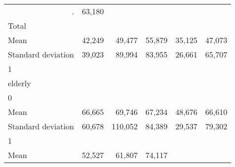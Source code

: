 \begin{tabular}{llllll}
  \multicolumn{1}{r}{.} &
  \multicolumn{1}{r}{63,180} \\
\multicolumn{1}{l}{\hspace{3em}Total} &
  \multicolumn{1}{|r}{} &
  \multicolumn{1}{r}{} &
  \multicolumn{1}{r}{} &
  \multicolumn{1}{r}{} &
  \multicolumn{1}{r}{} \\
\multicolumn{1}{l}{\hspace{4em}Mean} &
  \multicolumn{1}{|r}{42,249} &
  \multicolumn{1}{r}{49,477} &
  \multicolumn{1}{r}{55,879} &
  \multicolumn{1}{r}{35,125} &
  \multicolumn{1}{r}{47,073} \\
\multicolumn{1}{l}{\hspace{4em}Standard deviation} &
  \multicolumn{1}{|r}{39,023} &
  \multicolumn{1}{r}{89,994} &
  \multicolumn{1}{r}{83,955} &
  \multicolumn{1}{r}{26,661} &
  \multicolumn{1}{r}{65,707} \\
\multicolumn{1}{l}{\hspace{1em}1} &
  \multicolumn{1}{|r}{} &
  \multicolumn{1}{r}{} &
  \multicolumn{1}{r}{} &
  \multicolumn{1}{r}{} &
  \multicolumn{1}{r}{} \\
\multicolumn{1}{l}{\hspace{2em}elderly} &
  \multicolumn{1}{|r}{} &
  \multicolumn{1}{r}{} &
  \multicolumn{1}{r}{} &
  \multicolumn{1}{r}{} &
  \multicolumn{1}{r}{} \\
\multicolumn{1}{l}{\hspace{3em}0} &
  \multicolumn{1}{|r}{} &
  \multicolumn{1}{r}{} &
  \multicolumn{1}{r}{} &
  \multicolumn{1}{r}{} &
  \multicolumn{1}{r}{} \\
\multicolumn{1}{l}{\hspace{4em}Mean} &
  \multicolumn{1}{|r}{66,665} &
  \multicolumn{1}{r}{69,746} &
  \multicolumn{1}{r}{67,234} &
  \multicolumn{1}{r}{48,676} &
  \multicolumn{1}{r}{66,610} \\
\multicolumn{1}{l}{\hspace{4em}Standard deviation} &
  \multicolumn{1}{|r}{60,678} &
  \multicolumn{1}{r}{110,052} &
  \multicolumn{1}{r}{84,389} &
  \multicolumn{1}{r}{29,537} &
  \multicolumn{1}{r}{79,302} \\
\multicolumn{1}{l}{\hspace{3em}1} &
  \multicolumn{1}{|r}{} &
  \multicolumn{1}{r}{} &
  \multicolumn{1}{r}{} &
  \multicolumn{1}{r}{} &
  \multicolumn{1}{r}{} \\
\multicolumn{1}{l}{\hspace{4em}Mean} &
  \multicolumn{1}{|r}{52,527} &
  \multicolumn{1}{r}{61,807} &
  \multicolumn{1}{r}{74,117} &

\end{tabular}
